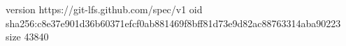 version https://git-lfs.github.com/spec/v1
oid sha256:c8e37e901d36b60371efcf0ab881469f8bff81d73e9d82ac88763314aba90223
size 43840
